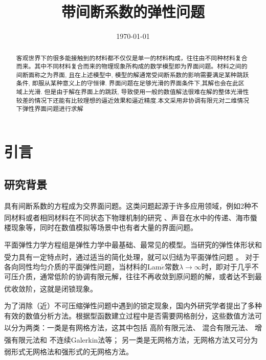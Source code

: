 \documentclass[a4paper,UTF8,titlepage]{ctexart}
\begin{document}
\title{带间断系数的弹性问题}
\date{\today}
\maketitle

\renewcommand{\abstractname}{\vspace{-2em}\large\bf 摘要}
\begin{abstract}
	客观世界下的很多能接触到的材料都不仅仅是单一的材料构成，往往由不同种材料复合而来。其中不同材料复合而来的物理现象所构成的数学模型即为界面问题。材料之间的间断面称之为界面, 且在上述模型中, 模型的解通常受间断系数的影响需要满足某种跳跃条件, 即服从某种意义上的守恒律. 界面问题在足够光滑的界面条件下,其解也会在此区域上光滑. 但是由于解在界面上的跳跃, 导致使用一般的数值解法很难在解的整体光滑性较差的情况下还能有比较理想的逼近效果和逼近精度.本文采用非协调有限元对二维情况下弹性界面问题进行求解  \\
\end{abstract}
\thispagestyle{empty}

\newpage
\tableofcontents

\newpage

\section{引言}

\subsection{研究背景}

具有间断系数的方程成为交界面问题。这类问题起源于许多应用领域，例如2种不同材料或者相同材料在不同状态下物理机制的研究 \textsuperscript{\cite{邵文婷2017求解一类交界面问题的模态基函数谱元法数值实验}}、声音在水中的传递、海市蜃楼现象等，同时在数值模拟等场景中也有者大量的界面问题。

平面弹性力学方程组是弹性力学中最基础、最常见的模型。当研究的弹性体形状和受力具有一定特点时，通过适当的简化处理，就可以归结为平面弹性问题 \textsuperscript{\cite{王兆清2018不可压缩平面问题的位移}}。
对于各向同性均匀介质的平面弹性问题，当材料的Lam$\acute{e}$常数$\lambda \to \infty$时，即对于几乎不可压介质，通常低阶的协调有限元解，往往不再收敛到原问题的解，或者达不到最优收敛阶，这就是闭锁现象\textsuperscript{\cite{陈绍春2007平面弹性的一个新的}}。

为了消除（近）不可压缩弹性问题中遇到的锁定现象，国内外研究学者提出了多种有效的数值分析方法。根据型函数建立过程中是否需要网格剖分，这些数值方法可以分为两类：一类是有网格方法，这其中包括
高阶有限元法\textsuperscript{\cite{peet2014legendre}}、
混合有限元法\textsuperscript{\cite{masud2011variational}}、
增强有限元法\textsuperscript{\cite{auricchio2005analysis}}和
不连续Galerkin法\textsuperscript{\cite{hansbo2003discontinuous}}等；
另一类是无网格方法，无网格方法又可分为弱形式无网格法和强形式的无网格方法\textsuperscript{\cite{王兆清2018不可压缩平面问题的位移}}。
\end{document}
